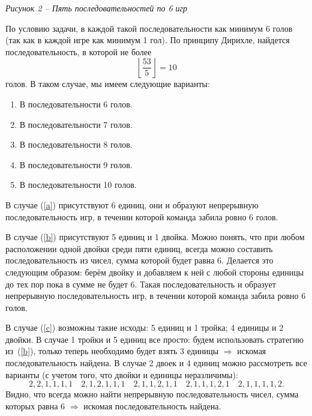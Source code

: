 \documentclass{article}
\begin{document}
\begin{enumerate}
\begin{center}
            \textit{Рисунок 2 -- Пять последовательностей по 6 игр}
        \end{center}
        По условию задачи, в каждой такой последовательности как минимум 6 голов (так как в каждой игре как минимум 1 гол). По принципу Дирихле, найдется последовательность, в которой не более
        \begin{equation}
            \left\lfloor\frac{53}{5}\right\rfloor = 10
        \end{equation}
        голов. В таком случае, мы имеем следующие варианты:
        \begin{enumerate}
            \item В последовательности 6 голов.\label{a}
            \item В последовательности 7 голов.\label{b}
            \item В последовательности 8 голов.\label{c}
            \item В последовательности 9 голов.\label{d}
            \item В последовательности 10 голов.\label{e}
        \end{enumerate}
        В случае (\ref{a}) присутствуют 6 единиц, они и образуют непрерывную последовательность игр, в течении которой команда забила ровно 6 голов.

        В случае (\ref{b}) присутствуют 5 единиц и 1 двойка. Можно понять, что при любом расположении одной двойки среди пяти единиц, всегда можно составить последовательность из чисел, сумма которой будет равна 6. Делается это следующим образом: берём двойку и добавляем к ней с любой стороны единицы до тех пор пока в сумме не будет 6. Такая последовательность и образует непрерывную последовательность игр, в течении которой команда забила ровно 6 голов.

        В случае (\ref{c}) возможны такие исходы: 5 единиц и 1 тройка; 4 единицы и 2 двойки. В случае 1 тройки и 5 единиц все просто: будем использовать стратегию из~(\ref{b}), только теперь необходимо будет взять 3 единицы $\Rightarrow$ искомая последовательность найдена. В случае 2 двоек и 4 единиц можно рассмотреть все варианты (с учетом того, что двойки и единицы неразличимы):
        \begin{equation}
            2,2,1,1,1,1 \quad 2,1,2,1,1,1 \quad 2,1,1,2,1,1 \quad 2,1,1,1,2,1\quad 2,1,1,1,1,2.
        \end{equation}
        Видно, что всегда можно найти непрерывную последовательность чисел, сумма которых равна 6 $\Rightarrow$ искомая последовательность найдена.


\end{enumerate}
\end{document}
